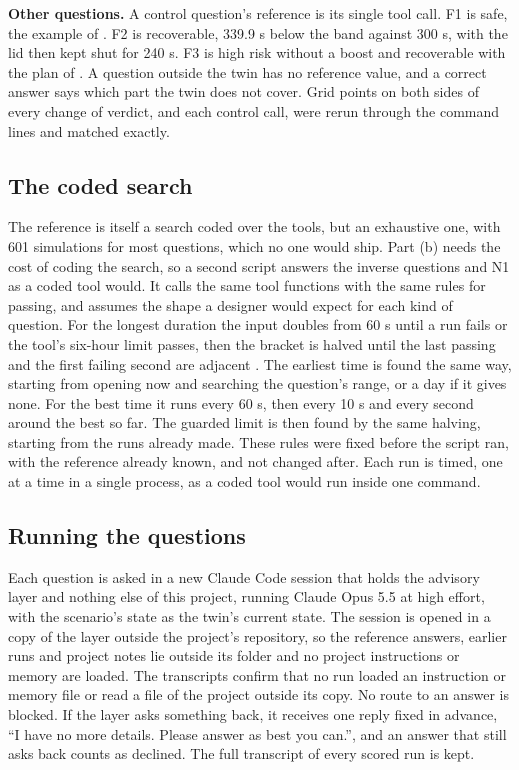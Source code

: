   \textbf{Other questions.} A control question's reference is its single tool call. F1 is safe, the example of
  . F2 is
  recoverable, 339.9 s below the band against 300 s, with the lid then kept shut for 240 s. F3 is
  high risk without a boost and recoverable with the plan of . A question outside
  the twin has no reference value, and a correct answer says which part the twin does not cover. Grid
  points on both sides of every change of verdict, and each control call, were rerun through the
  command lines and matched exactly.

  \subsection{The coded search}
  \label{sec:coded}

  The reference is itself a search coded over the tools, but an exhaustive one, with 601
  simulations for most questions, which no one would ship. Part (b) needs the cost of coding the
  search, so a second script answers the inverse questions and N1 as a coded tool would. It
  calls the same tool functions with the same rules for passing, and assumes the shape a designer
  would expect for each kind of question. For the longest duration the input doubles from 60 s
  until a run fails or the tool's six-hour limit passes, then the bracket is halved until the last
  passing and the first failing second are adjacent \cite{boyd2004convex}. The earliest time is
  found the same way, starting from opening now and searching the question's range, or a day if it
  gives none. For
  the best time it runs every 60 s, then every 10 s and every second around the best so far. The
  guarded limit is then found by the same halving, starting from the runs already made. These rules were fixed before the script
  ran, with the reference already known, and not changed after. Each run is timed, one at a time
  in a single process, as a coded tool would run inside one command.

  \subsection{Running the questions}
  \label{sec:runs}

  Each question is asked in a new Claude Code session that holds the advisory
  layer and nothing else of this project, running Claude Opus 5.5 \cite{anthropic2026opus55} at
  high effort, with the scenario's state as the twin's current state. The session is opened in a
  copy of the layer outside the project's repository, so the reference answers, earlier runs and
  project notes lie outside its folder and no project instructions or memory are loaded. The
  transcripts confirm that no run loaded an instruction or memory file or read a file of the
  project outside its copy. No route to an answer is blocked. If the layer asks something back, it receives one reply fixed in advance, ``I have no
  more details. Please answer as best you can.'', and an answer that still asks back counts as
  declined. The full transcript of every scored run is kept.

